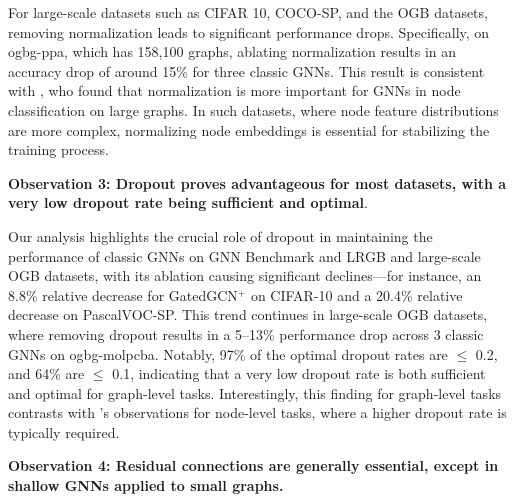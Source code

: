 For large-scale datasets such as CIFAR 10, COCO-SP, and the OGB datasets, removing normalization leads to significant performance drops. Specifically, on ogbg-ppa, which has 158,100 graphs, ablating normalization results in an accuracy drop of around 15\% for three classic GNNs. This result is consistent with \citet{luo2024classic}, who found that normalization is more important for GNNs in node classification on large graphs. In such datasets, where node feature distributions are more complex, normalizing node embeddings is essential for stabilizing the training process. 


\textbf{Observation 3: Dropout proves advantageous for most datasets, with a very low dropout rate being sufficient and optimal}. 

Our analysis highlights the crucial role of dropout in maintaining the performance of classic GNNs
on GNN Benchmark and LRGB and large-scale OGB datasets, with its ablation causing significant declines—for instance,  an 8.8\% relative decrease for GatedGCN$^+$ on CIFAR-10 and a 20.4\% relative decrease on PascalVOC-SP. This trend continues in large-scale OGB datasets, where removing dropout results in a 5–13\% performance drop across 3 classic GNNs on ogbg-molpcba. Notably, 97\% of the optimal dropout rates are $\le$ 0.2, and 64\% are $\le$ 0.1, indicating that a very low dropout rate is both sufficient and optimal for graph-level tasks. Interestingly, this finding for graph-level tasks contrasts with \citet{luo2024classic}’s observations for node-level tasks, where a higher dropout rate is typically required.



\textbf{Observation 4: Residual connections are generally essential, except in shallow GNNs applied to small graphs.} 

